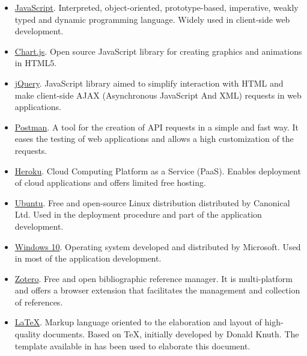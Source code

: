 \begin{itemize}
\item \href{https://www.javascript.com/}{JavaScript}. Interpreted, object-oriented, prototype-based, imperative, weakly typed and dynamic programming language. Widely used in client-side web development.\newline

\item \href{https://www.chartjs.org/}{Chart.js}. Open source JavaScript library for creating graphics and animations in HTML5.\newline

\item \href{https://jquery.com/}{jQuery}. JavaScript library aimed to simplify interaction with HTML and make client-side AJAX  (Asynchronous JavaScript And XML) requests in web applications.\newline

\item \href{https://www.postman.com/}{Postman}. A tool for the creation of API requests in a simple and fast way. It eases the testing of web applications and allows a high customization of the requests.\newline

\item \href{https://www.heroku.com/}{Heroku}. Cloud Computing Platform as a Service (PaaS). Enables deployment of cloud applications and offers limited free hosting.\newline

\item \href{https://ubuntu.com/}{Ubuntu}. Free and open-source Linux distribution distributed by Canonical Ltd. Used in the deployment procedure and part of the application development.\newline

\item \href{https://www.microsoft.com/en-us/windows/}{Windows 10}. Operating system developed and distributed by Microsoft. Used in most of the application development.\newline

\item \href{https://www.zotero.org/}{Zotero}. Free and open bibliographic reference manager. It is multi-platform and offers a browser extension that facilitates the management and collection of references.\newline

\item \href{https://www.latex-project.org/}{\LaTeX}. Markup language oriented to the elaboration and layout of high-quality documents. Based on \TeX, initially developed by Donald Knuth. The template available in \cite{salidoTFGgit} has been used to elaborate this document.\newline
	

\end{itemize}
